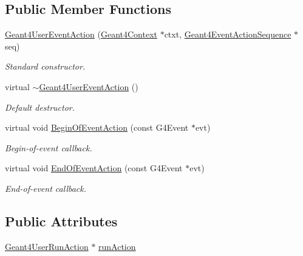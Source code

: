 \subsection*{Public Member Functions}
\begin{DoxyCompactItemize}
\item 
\hyperlink{class_d_d4hep_1_1_simulation_1_1_geant4_user_event_action_a5d519de614318d3277d06587b93bde92}{Geant4\+User\+Event\+Action} (\hyperlink{class_d_d4hep_1_1_simulation_1_1_geant4_context}{Geant4\+Context} $\ast$ctxt, \hyperlink{class_d_d4hep_1_1_simulation_1_1_geant4_event_action_sequence}{Geant4\+Event\+Action\+Sequence} $\ast$seq)
\begin{DoxyCompactList}\small\item\em Standard constructor. \end{DoxyCompactList}\item 
virtual \hyperlink{class_d_d4hep_1_1_simulation_1_1_geant4_user_event_action_ac79b641d26fd4e4cbecc99460baf4d4f}{$\sim$\+Geant4\+User\+Event\+Action} ()
\begin{DoxyCompactList}\small\item\em Default destructor. \end{DoxyCompactList}\item 
virtual void \hyperlink{class_d_d4hep_1_1_simulation_1_1_geant4_user_event_action_ab88c990f7010805421170eeb8f86ff86}{Begin\+Of\+Event\+Action} (const G4\+Event $\ast$evt)
\begin{DoxyCompactList}\small\item\em Begin-\/of-\/event callback. \end{DoxyCompactList}\item 
virtual void \hyperlink{class_d_d4hep_1_1_simulation_1_1_geant4_user_event_action_a5fe13da05fc37d5d69ed814b061cada0}{End\+Of\+Event\+Action} (const G4\+Event $\ast$evt)
\begin{DoxyCompactList}\small\item\em End-\/of-\/event callback. \end{DoxyCompactList}\end{DoxyCompactItemize}
\subsection*{Public Attributes}
\begin{DoxyCompactItemize}
\item 
\hyperlink{class_d_d4hep_1_1_simulation_1_1_geant4_user_run_action}{Geant4\+User\+Run\+Action} $\ast$ \hyperlink{class_d_d4hep_1_1_simulation_1_1_geant4_user_event_action_ac97fb9f30ba15e30d50897aabc0ad004}{run\+Action}
\end{DoxyCompactItemize}
